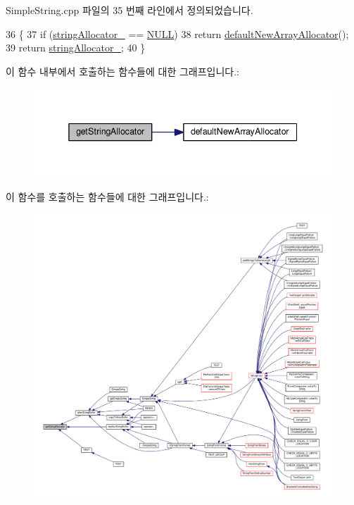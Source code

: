 Simple\+String.\+cpp 파일의 35 번째 라인에서 정의되었습니다.


\begin{DoxyCode}
36 \{
37     \textcolor{keywordflow}{if} (\hyperlink{class_simple_string_aa6bb63164af4af1bf62e59b19e14d4be}{stringAllocator\_} == \hyperlink{openavb__types__base__pub_8h_a070d2ce7b6bb7e5c05602aa8c308d0c4}{NULL})
38         \textcolor{keywordflow}{return} \hyperlink{_test_memory_allocator_8h_aec876a911821b794424b0f77a186f2ab}{defaultNewArrayAllocator}();
39     \textcolor{keywordflow}{return} \hyperlink{class_simple_string_aa6bb63164af4af1bf62e59b19e14d4be}{stringAllocator\_};
40 \}
\end{DoxyCode}


이 함수 내부에서 호출하는 함수들에 대한 그래프입니다.\+:
\nopagebreak
\begin{figure}[H]
\begin{center}
\leavevmode
\includegraphics[width=338pt]{class_simple_string_a26321ad812a6ba4e06b98cf958797b6f_cgraph}
\end{center}
\end{figure}




이 함수를 호출하는 함수들에 대한 그래프입니다.\+:
\nopagebreak
\begin{figure}[H]
\begin{center}
\leavevmode
\includegraphics[width=350pt]{class_simple_string_a26321ad812a6ba4e06b98cf958797b6f_icgraph}
\end{center}
\end{figure}


